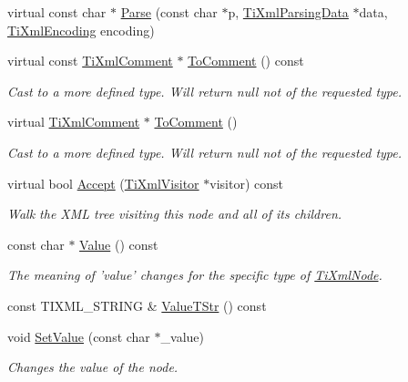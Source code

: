 \begin{DoxyCompactItemize}
virtual const char $\ast$ \hyperlink{classTiXmlComment_a43bddc18ac057734b41d84653b71d3e0}{Parse} (const char $\ast$p, \hyperlink{classTiXmlParsingData}{TiXmlParsingData} $\ast$data, \hyperlink{tinyxml_8h_a88d51847a13ee0f4b4d320d03d2c4d96}{TiXmlEncoding} encoding)
\item 
virtual const \hyperlink{classTiXmlComment}{TiXmlComment} $\ast$ \hyperlink{classTiXmlComment_a00fb4215c20a2399ea05ac9b9e7e68a0}{ToComment} () const 
\begin{DoxyCompactList}\small\item\em Cast to a more defined type. Will return null not of the requested type. \item\end{DoxyCompactList}\item 
virtual \hyperlink{classTiXmlComment}{TiXmlComment} $\ast$ \hyperlink{classTiXmlComment_acc7c7e07e13c23f17797d642981511df}{ToComment} ()
\begin{DoxyCompactList}\small\item\em Cast to a more defined type. Will return null not of the requested type. \item\end{DoxyCompactList}\item 
virtual bool \hyperlink{classTiXmlComment_a4382de0e50da973f11a23ea5852568bd}{Accept} (\hyperlink{classTiXmlVisitor}{TiXmlVisitor} $\ast$visitor) const 
\begin{DoxyCompactList}\small\item\em Walk the XML tree visiting this node and all of its children. \item\end{DoxyCompactList}\item 
const char $\ast$ \hyperlink{classTiXmlNode_a77943eb90d12c2892b1337a9f5918b41}{Value} () const 
\begin{DoxyCompactList}\small\item\em The meaning of 'value' changes for the specific type of \hyperlink{classTiXmlNode}{TiXmlNode}. \item\end{DoxyCompactList}\item 
const TIXML\_\-STRING \& \hyperlink{classTiXmlNode_a83ece13d2ea66dac66e0b21332229239}{ValueTStr} () const 
\item 
void \hyperlink{classTiXmlNode_a2a38329ca5d3f28f98ce932b8299ae90}{SetValue} (const char $\ast$\_\-value)
\begin{DoxyCompactList}\small\item\em Changes the value of the node. \item\end{DoxyCompactList}\item 

\end{DoxyCompactItemize}
